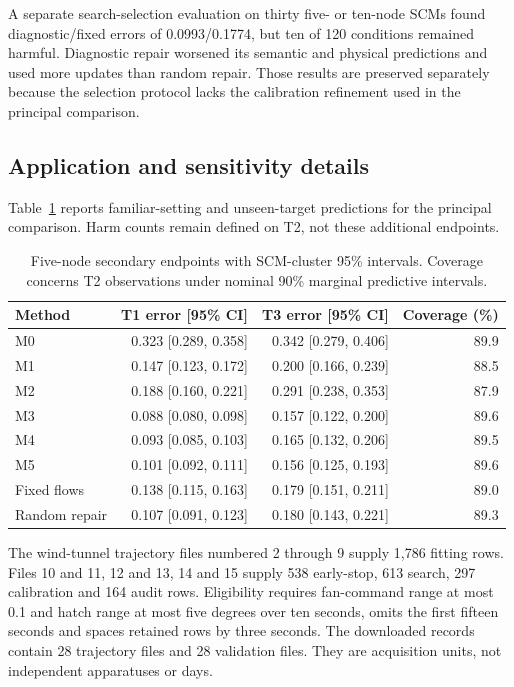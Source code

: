 \documentclass{svproc}
\begin{document}
A separate search-selection evaluation on thirty five- or ten-node SCMs found
diagnostic/fixed errors of 0.0993/0.1774, but ten of 120 conditions remained harmful.
Diagnostic repair worsened its semantic and physical predictions and used more
updates than random repair. Those results are preserved separately because the
selection protocol lacks the calibration refinement used in the principal
comparison.

\subsection*{Application and sensitivity details}
Table~\ref{tab:secondary} reports familiar-setting and unseen-target predictions
for the principal comparison. Harm counts remain defined on T2, not these
additional endpoints.

\begin{table}[!htb]
\setlength{\tabcolsep}{4pt}
\caption{Five-node secondary endpoints with SCM-cluster 95\% intervals. Coverage concerns T2 observations under nominal 90\% marginal predictive intervals.}
\label{tab:secondary}
\centering
\begin{tabular}{@{}lrrr@{}}
\toprule
Method & T1 error [95\% CI] & T3 error [95\% CI] & Coverage (\%)\\
\midrule
M0 & 0.323 [0.289, 0.358] & 0.342 [0.279, 0.406] & 89.9 \\
M1 & 0.147 [0.123, 0.172] & 0.200 [0.166, 0.239] & 88.5 \\
M2 & 0.188 [0.160, 0.221] & 0.291 [0.238, 0.353] & 87.9 \\
M3 & 0.088 [0.080, 0.098] & 0.157 [0.122, 0.200] & 89.6 \\
M4 & 0.093 [0.085, 0.103] & 0.165 [0.132, 0.206] & 89.5 \\
M5 & 0.101 [0.092, 0.111] & 0.156 [0.125, 0.193] & 89.6 \\
Fixed flows & 0.138 [0.115, 0.163] & 0.179 [0.151, 0.211] & 89.0 \\
Random repair & 0.107 [0.091, 0.123] & 0.180 [0.143, 0.221] & 89.3 \\
\bottomrule
\end{tabular}
\end{table}

The wind-tunnel trajectory files numbered 2 through 9 supply 1,786 fitting rows.
Files 10 and 11, 12 and 13, 14 and 15 supply 538 early-stop, 613 search, 297 calibration
and 164 audit rows. Eligibility requires fan-command range at most 0.1 and hatch
range at most five degrees over ten seconds, omits the first fifteen seconds
and spaces retained rows by three seconds. The downloaded records contain
28 trajectory files and 28 validation files. They are acquisition units, not
independent apparatuses or days.
\end{document}
